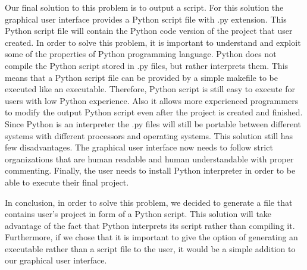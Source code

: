 \documentclass[journal,10pt,onecolumn,compsoc]{IEEEtran} \usepackage[margin=1.0in]{geometry} \usepackage{pdfpages} \usepackage{graphicx}
\begin{document}
\noindent Our final solution to this problem is to output a script. 
For this solution the graphical user interface provides a Python script file with .py extension. 
This Python script file will contain the Python code version of the project that user created. 
In order to solve this problem, it is important to understand and exploit some of the properties of Python programming language. 
Python does not compile the Python script stored in .py files, but rather interprets them. 
This means that a Python script file can be provided by a simple makefile to be executed like an executable. 
Therefore, Python script is still easy to execute for users with low Python experience. 
Also it allows more experienced programmers to modify the output Python script even after the project is created and finished. 
Since Python is an interpreter the .py files will still be portable between different systems with different processors and operating systems. 
This solution still has few disadvantages. 
The graphical user interface now needs to follow strict organizations that are human readable and human understandable with proper commenting. 
Finally, the user needs to install Python interpreter in order to be able to execute their final project.

\noindent In conclusion, in order to solve this problem, we decided to generate a file that contains user's project in form of a Python script. 
This solution will take advantage of the fact that Python interprets its script rather than compiling it. Furthermore, if we chose that it is important to give the option of generating an executable rather than a script file to the user, it would be a simple addition to our graphical user interface.
\newpage

\end{document}
